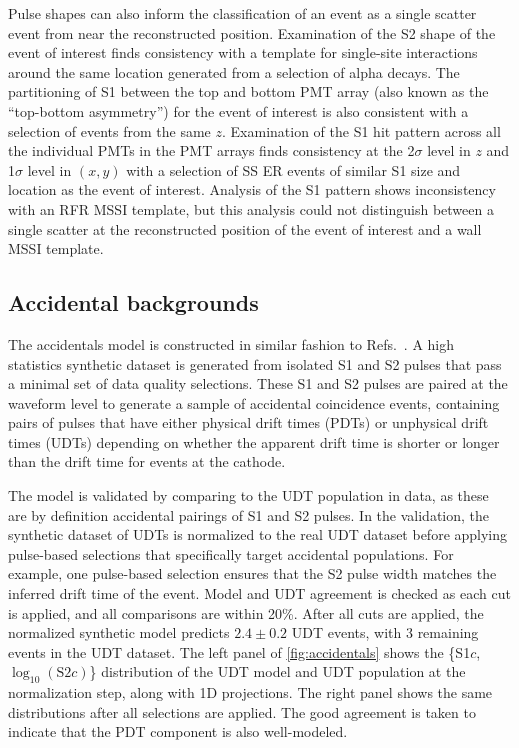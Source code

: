 Pulse shapes can also inform the classification of an event as a single scatter event from near the reconstructed position. Examination of the S2 shape of the event of interest finds consistency with a template for single-site interactions around the same location generated from a selection of alpha decays. The partitioning of S1 between the top and bottom PMT array (also known as the ``top-bottom asymmetry'') for the event of interest is also consistent with a selection of events from the same $z$. Examination of the S1 hit pattern across all the individual PMTs in the PMT arrays finds consistency at the 2$\sigma$ level in $z$ and 1$\sigma$ level in $(x,y)$ with a selection of SS ER events of similar S1 size and location as the event of interest. Analysis of the S1 pattern shows inconsistency with an RFR MSSI template, but this analysis could not distinguish between a single scatter at the reconstructed position of the event of interest and a wall MSSI template.  

\subsection{Accidental backgrounds}
The accidentals model is constructed in similar fashion to Refs.~\cite{LZ:SR3_WS2024,LZ:2025lowmass}. A high statistics synthetic dataset is generated from isolated S1 and S2 pulses that pass a minimal set of data quality selections. These S1 and S2 pulses are paired at the waveform level to generate a sample of accidental coincidence events, containing pairs of pulses that have either physical drift times (PDTs) or unphysical drift times (UDTs) depending on whether the apparent drift time is shorter or longer than the drift time for events at the cathode. 

The model is validated by comparing to the UDT population in data, as these are by definition accidental pairings of S1 and S2 pulses. In the validation, the synthetic dataset of UDTs is normalized to the real UDT dataset before applying pulse-based selections that specifically target accidental populations. For example, one pulse-based selection ensures that the S2 pulse width matches the inferred drift time of the event. Model and UDT agreement is checked as each cut is applied, and all comparisons are within 20\%. After all cuts are applied, the normalized synthetic model predicts $2.4\pm0.2$ UDT events, with 3 remaining events in the UDT dataset. The left panel of \autoref{fig:accidentals} shows the \{S1$c$,~$\log_{10}(\mathrm{S}2c)$\} distribution of the UDT model and UDT population at the normalization step, along with 1D projections. The right panel shows the same distributions after all selections are applied.  The good agreement is taken to indicate that the PDT component is also well-modeled. 

